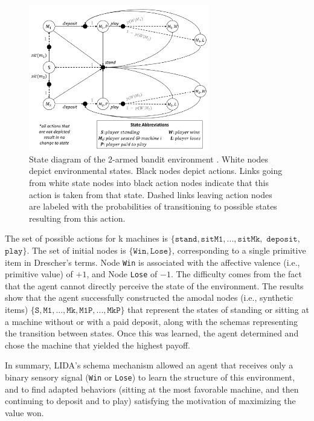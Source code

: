 \documentclass[runningheads]{llncs}
\begin{document}
\begin{figure}
	\centering
	\includegraphics[width=0.7\textwidth]{Figure_LIDA_bench.png}
	\caption{State diagram of the 2-armed bandit environment \cite[Fig. 5]{kugele2025_constructivist}.
	White nodes depict environmental states.
	Black nodes depict actions. 
	Links going from white state nodes into black action nodes indicate that this action is taken from that state. 
	Dashed links leaving action nodes are labeled with the probabilities of transitioning to possible states resulting from this action.} 
	\label{fig:lida_bench}
\end{figure}

The set of possible actions for k machines is $\{ \texttt{stand}, \texttt{sitM1},..., \texttt{sitMk},$ $\texttt{deposit},$ $\texttt{play} \}$. 
The set of initial nodes is $\{\texttt{Win}, \texttt{Lose} \}$, corresponding to a single primitive item in Drescher's terms.
Node \texttt{Win} is associated with the affective valence (i.e., primitive value) of $+1$, and Node \texttt{Lose} of $-1$.   
The difficulty comes from the fact that the agent cannot directly perceive the state of the environment.
The results show that the agent successfully constructed the amodal nodes (i.e., synthetic items) $\{ \texttt{S}, \texttt{M1},  ..., \texttt{Mk}, \texttt{M1P}, ...,  \texttt{MkP} \}$ that represent the states of standing or sitting at a machine without or with a paid deposit, along with the schemas representing the transition between states. 
Once this was learned, the agent determined and chose the machine that yielded the highest payoff.

In summary, LIDA's schema mechanism allowed an agent that receives only a binary sensory signal (\texttt{Win} or \texttt{Lose}) to learn the structure of this environment, and to find adapted behaviors (sitting at the most favorable machine, and then continuing to deposit and to play) satisfying the motivation of maximizing the value won. 
\end{document}
